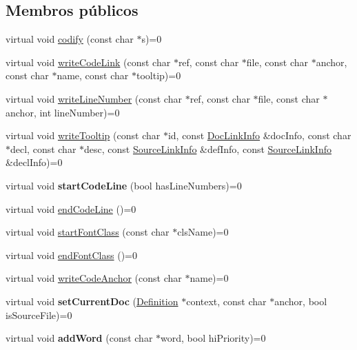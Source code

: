 \subsection*{Membros públicos}
\begin{DoxyCompactItemize}
\item 
virtual void \hyperlink{class_code_output_interface_abc701d9798e414eae3e9694be75dfa8a}{codify} (const char $\ast$s)=0
\item 
virtual void \hyperlink{class_code_output_interface_a21e25662f2bc8efbb5bbb8503aeae97f}{write\-Code\-Link} (const char $\ast$ref, const char $\ast$file, const char $\ast$anchor, const char $\ast$name, const char $\ast$tooltip)=0
\item 
virtual void \hyperlink{class_code_output_interface_a30af4b3b6e39508a95ba3219d1ba8323}{write\-Line\-Number} (const char $\ast$ref, const char $\ast$file, const char $\ast$anchor, int line\-Number)=0
\item 
virtual void \hyperlink{class_code_output_interface_a4ab86013abbf61a86e9c300eb805939a}{write\-Tooltip} (const char $\ast$id, const \hyperlink{struct_doc_link_info}{Doc\-Link\-Info} \&doc\-Info, const char $\ast$decl, const char $\ast$desc, const \hyperlink{struct_source_link_info}{Source\-Link\-Info} \&def\-Info, const \hyperlink{struct_source_link_info}{Source\-Link\-Info} \&decl\-Info)=0
\item 
\hypertarget{class_code_output_interface_a06d83d3279f21b34d89fbc6f2a303fb8}{virtual void {\bfseries start\-Code\-Line} (bool has\-Line\-Numbers)=0}\label{class_code_output_interface_a06d83d3279f21b34d89fbc6f2a303fb8}

\item 
virtual void \hyperlink{class_code_output_interface_a542863fa8a9697696ffc4d4b24678e1f}{end\-Code\-Line} ()=0
\item 
virtual void \hyperlink{class_code_output_interface_aaa0bdadd117e161c87149d902d70c863}{start\-Font\-Class} (const char $\ast$cls\-Name)=0
\item 
virtual void \hyperlink{class_code_output_interface_adcd22acfbc1c4c011802334b78cf5f01}{end\-Font\-Class} ()=0
\item 
virtual void \hyperlink{class_code_output_interface_aa29ff881359360e41a251d1d69fae142}{write\-Code\-Anchor} (const char $\ast$name)=0
\item 
\hypertarget{class_code_output_interface_a502e52b0cfa87df3d69840bb425f41e9}{virtual void {\bfseries set\-Current\-Doc} (\hyperlink{class_definition}{Definition} $\ast$context, const char $\ast$anchor, bool is\-Source\-File)=0}\label{class_code_output_interface_a502e52b0cfa87df3d69840bb425f41e9}

\item 
\hypertarget{class_code_output_interface_a323777067b6847c3e2fa3ab8cd5ed3bc}{virtual void {\bfseries add\-Word} (const char $\ast$word, bool hi\-Priority)=0}\label{class_code_output_interface_a323777067b6847c3e2fa3ab8cd5ed3bc}

\end{DoxyCompactItemize}


